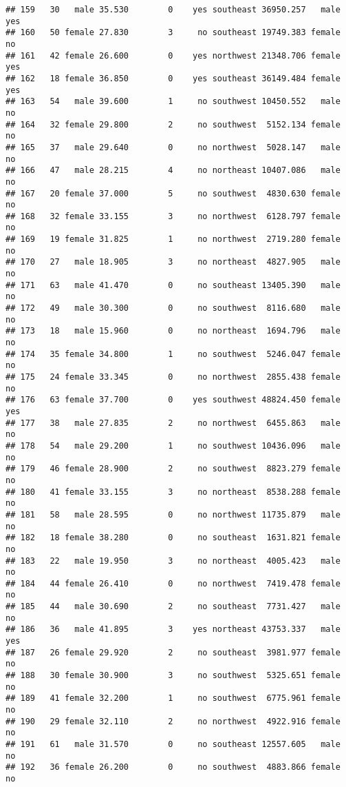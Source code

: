 \documentclass[
]{article}
\begin{document}
\begin{verbatim}
## 159   30   male 35.530        0    yes southeast 36950.257   male      yes
## 160   50 female 27.830        3     no southeast 19749.383 female       no
## 161   42 female 26.600        0    yes northwest 21348.706 female      yes
## 162   18 female 36.850        0    yes southeast 36149.484 female      yes
## 163   54   male 39.600        1     no southwest 10450.552   male       no
## 164   32 female 29.800        2     no southwest  5152.134 female       no
## 165   37   male 29.640        0     no northwest  5028.147   male       no
## 166   47   male 28.215        4     no northeast 10407.086   male       no
## 167   20 female 37.000        5     no southwest  4830.630 female       no
## 168   32 female 33.155        3     no northwest  6128.797 female       no
## 169   19 female 31.825        1     no northwest  2719.280 female       no
## 170   27   male 18.905        3     no northeast  4827.905   male       no
## 171   63   male 41.470        0     no southeast 13405.390   male       no
## 172   49   male 30.300        0     no southwest  8116.680   male       no
## 173   18   male 15.960        0     no northeast  1694.796   male       no
## 174   35 female 34.800        1     no southwest  5246.047 female       no
## 175   24 female 33.345        0     no northwest  2855.438 female       no
## 176   63 female 37.700        0    yes southwest 48824.450 female      yes
## 177   38   male 27.835        2     no northwest  6455.863   male       no
## 178   54   male 29.200        1     no southwest 10436.096   male       no
## 179   46 female 28.900        2     no southwest  8823.279 female       no
## 180   41 female 33.155        3     no northeast  8538.288 female       no
## 181   58   male 28.595        0     no northwest 11735.879   male       no
## 182   18 female 38.280        0     no southeast  1631.821 female       no
## 183   22   male 19.950        3     no northeast  4005.423   male       no
## 184   44 female 26.410        0     no northwest  7419.478 female       no
## 185   44   male 30.690        2     no southeast  7731.427   male       no
## 186   36   male 41.895        3    yes northeast 43753.337   male      yes
## 187   26 female 29.920        2     no southeast  3981.977 female       no
## 188   30 female 30.900        3     no southwest  5325.651 female       no
## 189   41 female 32.200        1     no southwest  6775.961 female       no
## 190   29 female 32.110        2     no northwest  4922.916 female       no
## 191   61   male 31.570        0     no southeast 12557.605   male       no
## 192   36 female 26.200        0     no southwest  4883.866 female       no

\end{verbatim}
\end{document}
